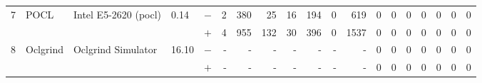 \begin{tabular}{lllll | rrrrrrr | rrrrrrr }
\hline
\multirow{ 2}{*}{7} & \multirow{ 2}{*}{POCL} & \multirow{ 2}{*}{Intel E5-2620 (pocl)} & \multirow{ 2}{*}{0.14} & $-$ & 2 & 380 & 25 & 16 & 194 & 0 & 619 & 0 & 0 & 0 & 0 & 0 & 0 & 0 \\& & & & $+$ & 4 & 955 & 132 & 30 & 396 & 0 & 1537 & 0 & 0 & 0 & 0 & 0 & 0 & 0 \\
\hline
\multirow{ 2}{*}{8} & \multirow{ 2}{*}{Oclgrind} & \multirow{ 2}{*}{Oclgrind Simulator} & \multirow{ 2}{*}{16.10} & $-$ & - & - & - & - & - & - & - & 0 & 0 & 0 & 0 & 0 & 0 & 0 \\& & & & $+$ & - & - & - & - & - & - & - & 0 & 0 & 0 & 0 & 0 & 0 & 0 \\
  \bottomrule
\end{tabular}

